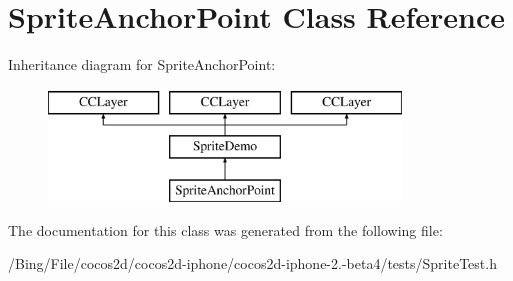 \hypertarget{interface_sprite_anchor_point}{\section{Sprite\-Anchor\-Point Class Reference}
\label{interface_sprite_anchor_point}
}
Inheritance diagram for Sprite\-Anchor\-Point\-:\begin{figure}[H]
\begin{center}
\leavevmode
\includegraphics[height=3.000000cm]{interface_sprite_anchor_point}
\end{center}
\end{figure}


The documentation for this class was generated from the following file\-:\begin{DoxyCompactItemize}
\item 
/\-Bing/\-File/cocos2d/cocos2d-\/iphone/cocos2d-\/iphone-\/2.-\/beta4/tests/Sprite\-Test.\-h\end{DoxyCompactItemize}
